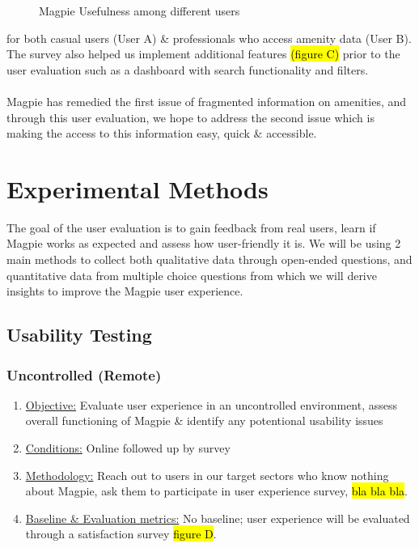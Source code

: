 \documentclass{report}
\begin{document}
\begin{figure}[h]
    \centering
    \caption{Magpie Usefulness among different users}
    \label{fig:yourlabel}
\end{figure}
for both casual users (User A) \& professionals who access amenity data (User B). The survey also helped us implement additional features \hl{(figure C)} prior to the user evaluation such as a dashboard with search functionality and filters.\\ \\
Magpie has remedied the first issue of fragmented information on amenities, and through this user evaluation, we hope to address the second issue which is making the access to this information easy, quick \& accessible.

\chapter{Experimental Methods}
The goal of the user evaluation is to gain feedback from real users, learn if Magpie works as expected and assess how user-friendly it is. We will be using 2 main methods to collect both qualitative data through open-ended questions, and quantitative data from multiple choice questions from which we will derive insights to improve the Magpie user experience.
\section{Usability Testing}
\subsection{Uncontrolled (Remote)}
\begin{enumerate}
    \item \underline{Objective:} Evaluate user experience in an uncontrolled environment, assess overall functioning of Magpie \& identify any potentional usability issues
    \item \underline{Conditions:} Online followed up by survey
    \item \underline{Methodology:} Reach out to users in our target sectors who know nothing about Magpie, ask them to participate in user experience survey, \hl{bla bla bla}.
    \item \underline{Baseline \& Evaluation metrics:} No baseline; user experience will be evaluated through a satisfaction survey \hl{figure D}.
\end{enumerate}
\end{document}
